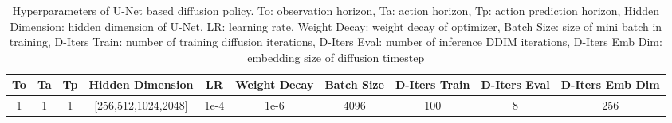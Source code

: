 \begin{table}[H]
    \centering
    \setlength\tabcolsep{9 pt}
    \begin{tabular}{cccccccccc}
    \toprule
    To & Ta & Tp & Hidden Dimension & LR & Weight Decay & Batch Size & D-Iters Train & D-Iters Eval & D-Iters Emb Dim \\
    \midrule
    1 & 1 & 1 & [256,512,1024,2048] & 1e-4 & 1e-6 & 4096 & 100 & 8 & 256 \\
    \bottomrule
    \end{tabular}
    \caption{Hyperparameters of U-Net based diffusion policy. To: observation horizon, Ta: action horizon, Tp: action prediction horizon, Hidden Dimension: hidden dimension of U-Net, LR: learning rate, Weight Decay: weight decay of optimizer, Batch Size: size of mini batch in training, D-Iters Train: number of training diffusion iterations, D-Iters Eval: number of inference DDIM iterations, D-Iters Emb Dim: embedding size of diffusion timestep}
    \label{table:IL_hyper}
\end{table}